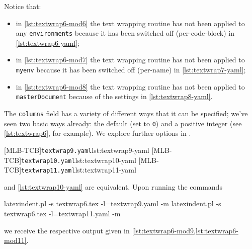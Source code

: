 	Notice that:
	\begin{itemize}
		\item in \cref{lst:textwrap6-mod6} the text wrapping routine has not been applied to any
		      \texttt{environments} because it has been switched off (per-code-block) in
		      \cref{lst:textwrap6-yaml};
		\item in \cref{lst:textwrap6-mod7} the text wrapping routine has not been applied to
		      \texttt{myenv} because it has been switched off (per-name) in \cref{lst:textwrap7-yaml};
		\item in \cref{lst:textwrap6-mod8} the text wrapping routine has not been applied to
		      \texttt{masterDocument} because of the settings in \cref{lst:textwrap8-yaml}.
	\end{itemize}

	The \texttt{columns} field has a variety of different ways that it can be specified;
	we've seen two basic ways already: the default (set to \texttt{0}) and a positive integer
	(see \vref{lst:textwrap6}, for example). We explore further options in
	.

	\begin{cmhtcbraster}[raster columns=3,
			raster left skip=-3.5cm,
			raster right skip=-2cm,
			raster column skip=.03\linewidth]
		[MLB-TCB]{\texttt{textwrap9.yaml}}{lst:textwrap9-yaml}
		[MLB-TCB]{\texttt{textwrap10.yaml}}{lst:textwrap10-yaml}
		[MLB-TCB]{\texttt{textwrap11.yaml}}{lst:textwrap11-yaml}
	\end{cmhtcbraster}

	 and \cref{lst:textwrap10-yaml} are equivalent. Upon running
	the commands
	\begin{commandshell}
latexindent.pl -s textwrap6.tex -l=textwrap9.yaml -m
latexindent.pl -s textwrap6.tex -l=textwrap11.yaml -m
\end{commandshell}
	we receive the respective output given in \cref{lst:textwrap6-mod9,lst:textwrap6-mod11}.

	\begin{widepage}

	\end{widepage}

